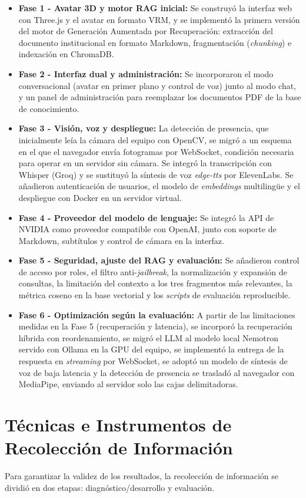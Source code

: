 \begin{itemize}
    \item \textbf{Fase 1 - Avatar 3D y motor RAG inicial:} Se construyó la interfaz web con Three.js y el avatar en formato VRM, y se implementó la primera versión del motor de Generación Aumentada por Recuperación: extracción del documento institucional en formato Markdown, fragmentación (\textit{chunking}) e indexación en ChromaDB.
    \item \textbf{Fase 2 - Interfaz dual y administración:} Se incorporaron el modo conversacional (avatar en primer plano y control de voz) junto al modo chat, y un panel de administración para reemplazar los documentos PDF de la base de conocimiento.
    \item \textbf{Fase 3 - Visión, voz y despliegue:} La detección de presencia, que inicialmente leía la cámara del equipo con OpenCV, se migró a un esquema en el que el navegador envía fotogramas por WebSocket, condición necesaria para operar en un servidor sin cámara. Se integró la transcripción con Whisper (Groq) y se sustituyó la síntesis de voz \textit{edge-tts} por ElevenLabs. Se añadieron autenticación de usuarios, el modelo de \textit{embeddings} multilingüe y el despliegue con Docker en un servidor virtual.
    \item \textbf{Fase 4 - Proveedor del modelo de lenguaje:} Se integró la API de NVIDIA como proveedor compatible con OpenAI, junto con soporte de Markdown, subtítulos y control de cámara en la interfaz.
    \item \textbf{Fase 5 - Seguridad, ajuste del RAG y evaluación:} Se añadieron control de acceso por roles, el filtro anti-\textit{jailbreak}, la normalización y expansión de consultas, la limitación del contexto a los tres fragmentos más relevantes, la métrica coseno en la base vectorial y los \textit{scripts} de evaluación reproducible.
    \item \textbf{Fase 6 - Optimización según la evaluación:} A partir de las limitaciones medidas en la Fase 5 (recuperación y latencia), se incorporó la recuperación híbrida con reordenamiento, se migró el LLM al modelo local Nemotron servido con Ollama en la GPU del equipo, se implementó la entrega de la respuesta en \textit{streaming} por WebSocket, se adoptó un modelo de síntesis de voz de baja latencia y la detección de presencia se trasladó al navegador con MediaPipe, enviando al servidor solo las cajas delimitadoras.
\end{itemize}

\section{Técnicas e Instrumentos de Recolección de Información}
Para garantizar la validez de los resultados, la recolección de información se dividió en dos etapas: diagnóstico/desarrollo y evaluación.

